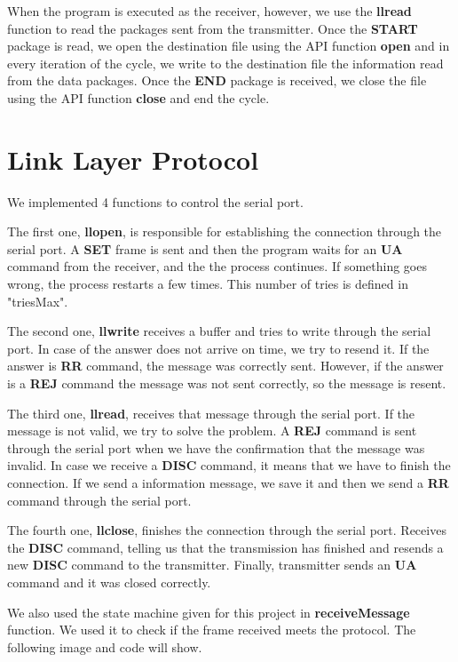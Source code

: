 \documentclass[a4paper]{article}
\begin{document}
When the program is executed as the receiver, however, we use the \textbf{llread} function to read the packages sent from the transmitter. Once the \textbf{START} package is read, we open the destination file using the API function \textbf{open} and in every iteration of the cycle, we write to the destination file the information read from the data packages. Once the \textbf{END} package is received, we close the file using the API function \textbf{close} and end the cycle.

\section{Link Layer Protocol}

We implemented 4 functions to control the serial port. 

The first one, \textbf{llopen}, is responsible for establishing the connection through the serial port. A \textbf{SET} frame is sent and then the program waits for an \textbf{UA} command from the receiver, and the the process continues. If something goes wrong, the process restarts a few times. This number of tries is defined in "triesMax".
 
The second one, \textbf{llwrite} receives a buffer and tries to write through the serial port. In case of the answer does not arrive on time, we try to resend it. If the answer is \textbf{RR} command, the message was correctly sent. However, if the answer is a \textbf{REJ} command the message was not sent correctly, so the message is resent. 

The third one, \textbf{llread}, receives that message through the serial port. If the message is not valid, we try to solve the problem. A \textbf{REJ} command is sent through the serial port when we have the confirmation that the message was invalid. In case we receive a \textbf{DISC} command, it means that we have to finish the connection. If we send a information message, we save it and then we send a \textbf{RR} command through the serial port. 
 
The fourth one, \textbf{llclose}, finishes the connection through the serial port. Receives the \textbf{DISC} command, telling us that the transmission has finished and resends a new \textbf{DISC} command to the transmitter. Finally, transmitter sends an \textbf{UA} command and it was closed correctly. 
 
We also used the state machine given for this project in \textbf{receiveMessage} function.  We used it to check if the frame received meets the protocol. The following image and code will show.
\end{document}
